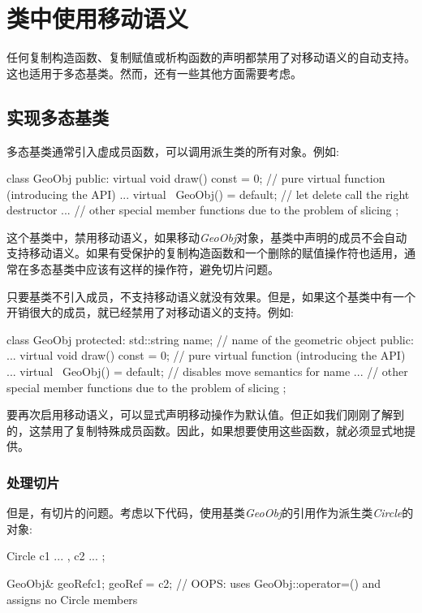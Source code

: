 \section{类中使用移动语义}
任何复制构造函数、复制赋值或析构函数的声明都禁用了对移动语义的自动支持。这也适用于多态基类。然而，还有一些其他方面需要考虑。

\subsection{实现多态基类}

多态基类通常引入虚成员函数，可以调用派生类的所有对象。例如:

\begin{cppcode}
class GeoObj {
	public:
	virtual void draw() const = 0; // pure virtual function (introducing the API)
	...
	virtual ~GeoObj() = default; // let delete call the right destructor
	... // other special member functions due to the problem of slicing
};
\end{cppcode}

这个基类中，禁用移动语义，如果移动\textit{GeoObj}对象，基类中声明的成员不会自动支持移动语义。如果有受保护的复制构造函数和一个删除的赋值操作符也适用，通常在多态基类中应该有这样的操作符，避免切片问题。

只要基类不引入成员，不支持移动语义就没有效果。但是，如果这个基类中有一个开销很大的成员，就已经禁用了对移动语义的支持。例如:

\begin{cppcode}
class GeoObj {
protected:
	std::string name; // name of the geometric object
public:
	...
	virtual void draw() const = 0; // pure virtual function (introducing the API)
	...
	virtual ~GeoObj() = default; // disables move semantics for name
	... // other special member functions due to the problem of slicing
};
\end{cppcode}

要再次启用移动语义，可以显式声明移动操作为默认值。但正如我们刚刚了解到的，这禁用了复制特殊成员函数。因此，如果想要使用这些函数，就必须显式地提供。

\subsubsection{处理切片}

但是，有切片的问题。考虑以下代码，使用基类\textit{GeoObj}的引用作为派生类\textit{Circle}的对象:

\begin{cppcode}
Circle c1{ ... }, c2{ ... };

GeoObj& geoRef{c1};
geoRef = c2; // OOPS: uses GeoObj::operator=() and assigns no Circle members
\end{cppcode}


